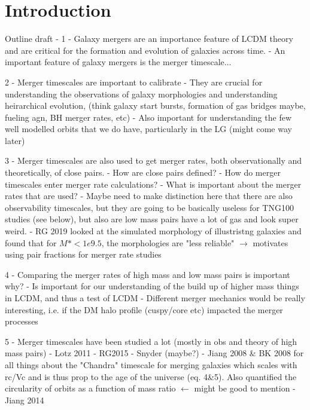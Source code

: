 \documentclass[twocolumn,linenumbers]{aastex631}
\begin{document}


\section{Introduction} \label{sec:intro}
Outline draft - 
1 - Galaxy mergers are an importance feature of LCDM theory and are critical for the formation and evolution of galaxies across time. 
    - An important feature of galaxy mergers is the merger timescale...

2 - Merger timescales are important to calibrate 
    - They are crucial for understanding the observations of galaxy morphologies and understanding heirarchical evolution, (think galaxy start bursts, formation of gas bridges maybe, fueling agn, BH merger rates, etc)
    - Also important for understanding the few well modelled orbits that we do have, particularly in the LG (might come way later) 

3 - Merger timescales are also used to get merger rates, both observationally and theoretically, of close pairs.
    - How are close pairs defined? 
    - How do merger timescales enter merger rate calculations?
    - What is important about the merger rates that are used? 
    - Maybe need to make distinction here that there are also observability timescales, but they are going to be basically useless for TNG100 studies (see below), but also are low mass pairs have a lot of gas and look super weird. 
    - RG 2019 looked at the simulated morphology of illustristng galaxies and found that for $M*<1e9.5$, the morphologies are "less reliable" $\to$ motivates using pair fractions for merger rate studies 


4 - Comparing the merger rates of high mass and low mass pairs is important why?
    - Is important for our understanding of the build up of higher mass things in LCDM, and thus a test of LCDM
    - Different merger mechanics would be really interesting, i.e. if the DM halo profile (cuspy/core etc) impacted the merger processes

5 - Merger timescales have been studied a lot (mostly in obs and theory of high mass pairs)
    - Lotz 2011
    - RG2015
    - Snyder (maybe?) 
    - Jiang 2008 \& BK 2008 for all things about the "Chandra" timescale for merging galaxies which scales with rc/Vc and is thus prop to the age of the universe (eq. 4\&5). Also quantified the circularity of orbits as a function of mass ratio $\leftarrow$ might be good to mention
    - Jiang 2014 
\end{document}
